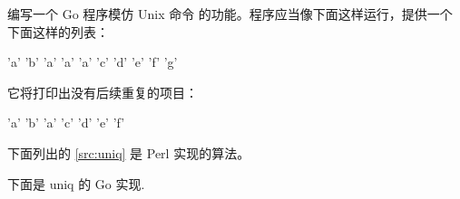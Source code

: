 \begin{Exercise}[title={Uniq},difficulty=0]
\label{ex:Uniq}
\Question\label{ex:Uniq q1} 编写一个 Go 程序模仿 Unix 命令 
 的功能。程序应当像下面这样运行，提供一个下面这样的列表：

\begin{display}
'a' 'b' 'a' 'a' 'a' 'c' 'd' 'e' 'f' 'g'
\end{display}

它将打印出没有后续重复的项目：

\begin{display}
'a' 'b' 'a' 'c' 'd' 'e' 'f'
\end{display}
\exdisfix
下面列出的 \ref{src:uniq} 是 Perl 实现的算法。


\end{Exercise}

\begin{Answer}
\Question 下面是 uniq 的 Go 实现.

\end{Answer}
